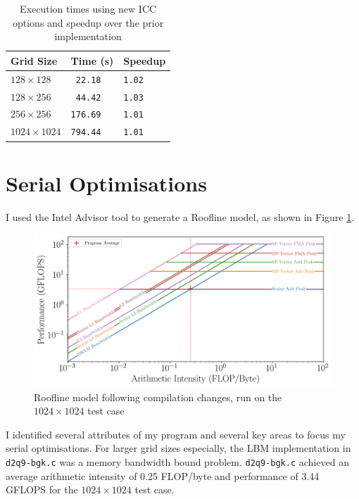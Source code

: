 \documentclass[twocolumn, a4paper]{article}
\begin{document}
\begin{table}[htbp]
  \begin{center}
  \caption{Execution times using new ICC options and speedup over the prior implementation}\label{tab:compiler_options}
  \begin{tabular}[t]{l | l l} 
      \hline\hline
      Grid Size&Time (s)&Speedup\\
      \hline
      $128 \times 128$&\texttt{ 22.18}&\texttt{1.02}\\
      $128 \times 256$&\texttt{ 44.42}&\texttt{1.03}\\
      $256 \times 256$&\texttt{176.69}&\texttt{1.01}\\
      $1024 \times 1024$&\texttt{794.44}&\texttt{1.01}\\
      \hline
    \end{tabular}
  \end{center}
\end{table}

\section{Serial Optimisations}

I used the Intel Advisor tool to generate a Roofline model, as shown in Figure \ref{fig:roofline_compiler}.

\begin{figure}[htbp]
\includegraphics[width=\linewidth]{roofline_compiler.png}
\caption{Roofline model following compilation changes, run on the $1024\times1024$ test case}\label{fig:roofline_compiler}
\end{figure}

I identified several attributes of my program and several key areas to focus my serial optimisations.
For larger grid sizes especially, the LBM implementation in \texttt{d2q9-bgk.c} was a memory bandwidth bound problem.
\texttt{d2q9-bgk.c} achieved an average arithmetic intensity of 0.25 FLOP/byte and performance of 3.44 GFLOPS for the $1024 \times 1024$ test case.
\end{document}
